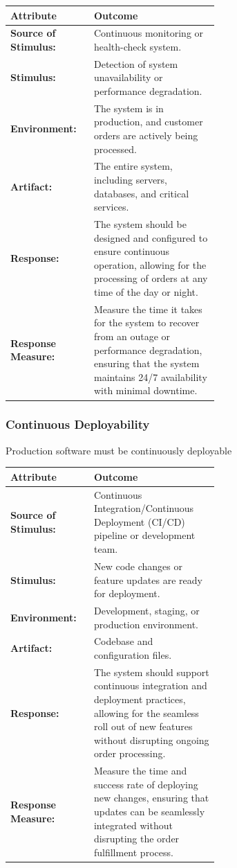 \documentclass[conference]{IEEEtran}
\begin{document}
\begin{table}[h]
    \centering
    \begin{tabular}{|l|p{0.6\linewidth}|}
        \hline
        \textbf{Attribute} & \textbf{Outcome} \\
        \hline
        \textbf{Source of Stimulus:} & Continuous monitoring or health-check system. \\
        \hline
        \textbf{Stimulus:} & Detection of system unavailability or performance degradation. \\
        \hline
        \textbf{Environment:} & The system is in production, and customer orders are actively being processed. \\
        \hline
        \textbf{Artifact:} & The entire system, including servers, databases, and critical services. \\
        \hline
        \textbf{Response:} & The system should be designed and configured to ensure continuous operation, allowing for the processing of orders at any time of the day or night. \\
        \hline
        \textbf{Response Measure:} & Measure the time it takes for the system to recover from an outage or performance degradation, ensuring that the system maintains 24/7 availability with minimal downtime. \\
        \hline
    \end{tabular}
\end{table}

\subsubsection{\textbf{Continuous Deployability}}Production software must be continuously deployable

\begin{table}[h]
    \centering
    \begin{tabular}{|l|p{0.6\linewidth}|}
        \hline
        \textbf{Attribute} & \textbf{Outcome} \\
        \hline
        \textbf{Source of Stimulus:} & Continuous Integration/Continuous Deployment (CI/CD) pipeline or development team. \\
        \hline
        \textbf{Stimulus:} & New code changes or feature updates are ready for deployment. \\
        \hline
        \textbf{Environment:} & Development, staging, or production environment. \\
        \hline
        \textbf{Artifact:} & Codebase and configuration files. \\
        \hline
        \textbf{Response:} & The system should support continuous integration and deployment practices, allowing for the seamless roll out of new features without disrupting ongoing order processing. \\
        \hline
        \textbf{Response Measure:} & Measure the time and success rate of deploying new changes, ensuring that updates can be seamlessly integrated without disrupting the order fulfillment process. \\
        \hline
    \end{tabular}
\end{table}
\end{document}
